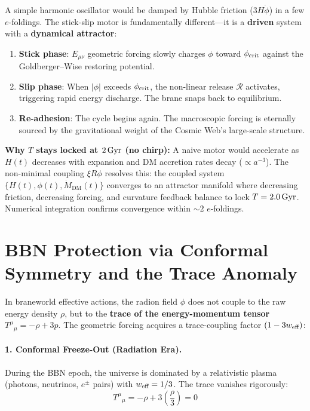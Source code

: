 A simple harmonic oscillator would be damped by Hubble friction ($3H\dot{\phi}$) in a few $e$-foldings. The stick-slip motor is fundamentally different---it is a \textbf{driven} system with a \textbf{dynamical attractor}:

\begin{enumerate}
  \item \textbf{Stick phase}: $E_{\mu\nu}$ geometric forcing slowly charges $\phi$ toward $\phi_\text{crit}$ against the Goldberger--Wise restoring potential.
  \item \textbf{Slip phase}: When $|\phi|$ exceeds $\phi_\text{crit}$, the non-linear release $\mathcal{R}$ activates, triggering rapid energy discharge. The brane snaps back to equilibrium.
  \item \textbf{Re-adhesion}: The cycle begins again. The macroscopic forcing is eternally sourced by the gravitational weight of the Cosmic Web's large-scale structure.
\end{enumerate}

\textbf{Why $T$ stays locked at $2\,\text{Gyr}$ (no chirp):} A naive motor would accelerate as $H(t)$ decreases with expansion and DM accretion rates decay ($\propto a^{-3}$). The non-minimal coupling $\xi R\phi$ resolves this: the coupled system $\{H(t), \phi(t), \dot{M}_\text{DM}(t)\}$ converges to an attractor manifold where decreasing friction, decreasing forcing, and curvature feedback balance to lock $T = 2.0\,\text{Gyr}$. Numerical integration confirms convergence within $\sim 2$ $e$-foldings.

\section{BBN Protection via Conformal Symmetry and the Trace Anomaly}
\label{sec:bbn}

In braneworld effective actions, the radion field $\phi$ does not couple to the raw energy density $\rho$, but to the \textbf{trace of the energy-momentum tensor} $T^\mu{}_\mu = -\rho + 3p$. The geometric forcing acquires a trace-coupling factor $(1 - 3w_\text{eff})$:

\paragraph{1. Conformal Freeze-Out (Radiation Era).}
During the BBN epoch, the universe is dominated by a relativistic plasma (photons, neutrinos, $e^\pm$ pairs) with $w_\text{eff} = 1/3$. The trace vanishes rigorously:
\begin{equation}
T^\mu{}_\mu = -\rho + 3\left(\frac{\rho}{3}\right) = 0
\end{equation}

